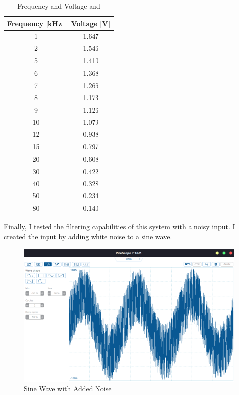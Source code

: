 \begin{table}[htbp]
    \centering
    \begin{tabular}{cc}
        \hline
        \textbf{Frequency [kHz]} & \textbf{Voltage [V]} \\
        \hline
        1   & 1.647 \\
        2   & 1.546 \\
        5   & 1.410 \\
        6   & 1.368 \\
        7   & 1.266 \\
        8   & 1.173 \\
        9   & 1.126 \\
        10  & 1.079 \\
        12  & 0.938 \\
        15  & 0.797 \\
        20  & 0.608 \\
        30  & 0.422 \\
        40  & 0.328 \\
        50  & 0.234 \\
        80  & 0.140 \\
        \hline
    \end{tabular}
    \caption{Frequency and Voltage  and }
    \label{tab:freq_mag_data_2}
\end{table}

Finally, I tested the filtering capabilities of this system with a noisy input. I created the input by adding white noise to a sine wave.

\begin{figure}[H]
    \centering
    \includegraphics[width=150mm, keepaspectratio]{figures/sineerror.png}
    \caption{Sine Wave with Added Noise}
    \label{fig:sineerror}
\end{figure}

